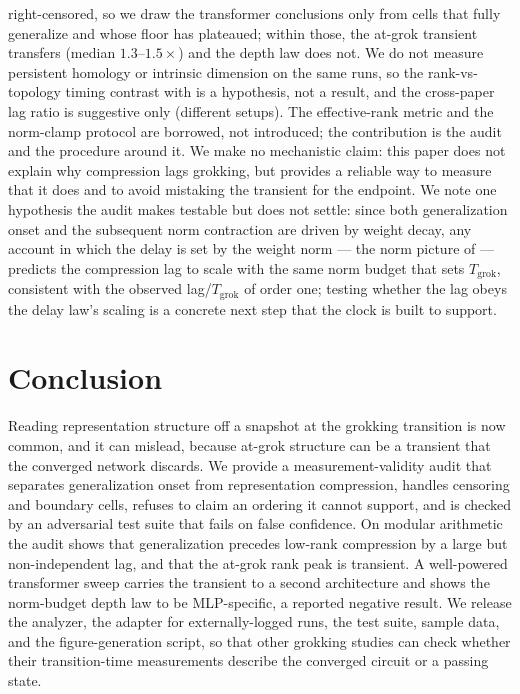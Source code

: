 \documentclass[11pt]{article}
\begin{document}
right-censored, so we draw the transformer conclusions only from cells that fully generalize and whose
floor has plateaued; within those, the at-grok transient transfers (median $1.3$--$1.5\times$) and the
depth law does not. We do not measure persistent homology
or intrinsic dimension on the same runs, so the rank-vs-topology timing contrast with
\citet{tang2026topological} is a hypothesis, not a result, and the cross-paper lag ratio is suggestive
only (different setups). The effective-rank metric and the norm-clamp protocol are borrowed, not
introduced; the contribution is the audit and the procedure around it. We make no mechanistic claim: this
paper does not explain why compression lags grokking, but provides a reliable way to measure that
it does and to avoid mistaking the transient for the endpoint. We note one hypothesis the audit makes
testable but does not settle: since both generalization onset and the subsequent norm contraction are
driven by weight decay, any
account in which the delay is set by the weight norm --- the norm picture of \citet{omnigrok} --- predicts
the compression lag to scale with the same norm budget that sets $T_{\mathrm{grok}}$, consistent with the
observed lag/$T_{\mathrm{grok}}$ of order one; testing whether the lag obeys the delay law's scaling is a
concrete next step that the clock is built to support.

\section{Conclusion}
Reading representation structure off a snapshot at the grokking transition is now common, and it can
mislead, because at-grok structure can be a transient that the converged network discards. We provide a
measurement-validity audit that separates generalization onset from representation compression, handles
censoring and boundary cells, refuses to claim an ordering it cannot support, and is checked by an
adversarial test suite that fails on false confidence. On modular arithmetic the audit shows that
generalization precedes low-rank compression by a large but non-independent lag, and that the at-grok
rank peak is transient. A well-powered transformer sweep carries the transient to a second architecture
and shows the norm-budget depth law to be MLP-specific, a reported negative result. We release the
analyzer, the adapter for externally-logged runs, the test suite, sample data, and the figure-generation
script, so that other grokking studies can check whether their transition-time measurements describe the
converged circuit or a passing state.
\end{document}
